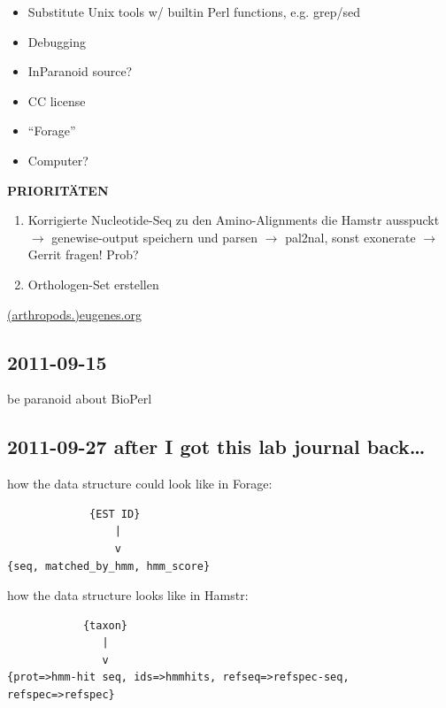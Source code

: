 \vspace{1em}
\begin{minipage}{0.4\textwidth}
	\begin{itemize}
		\item Substitute Unix tools w/ builtin Perl functions, e.g. grep/sed
		\item Debugging
		\item InParanoid source?
		\item CC license
		\item ``Forage''
		\item Computer?
	\end{itemize}
\end{minipage}
\hfill
\begin{minipage}{0.5\textwidth}
\textbf{PRIORITÄTEN}
\renewcommand{\labelenumi}{\arabic{enumi}.}
	\begin{enumerate}
		\item Korrigierte Nucleotide-Seq zu den Amino-Alignments die Hamstr
		ausspuckt $\rightarrow$ genewise-output speichern und parsen $\rightarrow$ pal2nal,
		sonst exonerate $\rightarrow$ Gerrit fragen! Prob?
		\item Orthologen-Set erstellen
	\end{enumerate}
\url{(arthropods.)eugenes.org}
\end{minipage}

\subsection*{2011-09-15}

be paranoid about BioPerl

\subsection*{2011-09-27 after I got this lab journal back\dots}

how the data structure could look like in Forage:

\begin{verbatim}
             {EST ID}
                 |
                 v
{seq, matched_by_hmm, hmm_score}
\end{verbatim}

how the data structure looks like in Hamstr:
\begin{verbatim}
            {taxon}
               |
               v
{prot=>hmm-hit seq, ids=>hmmhits, refseq=>refspec-seq, refspec=>refspec}
\end{verbatim}

